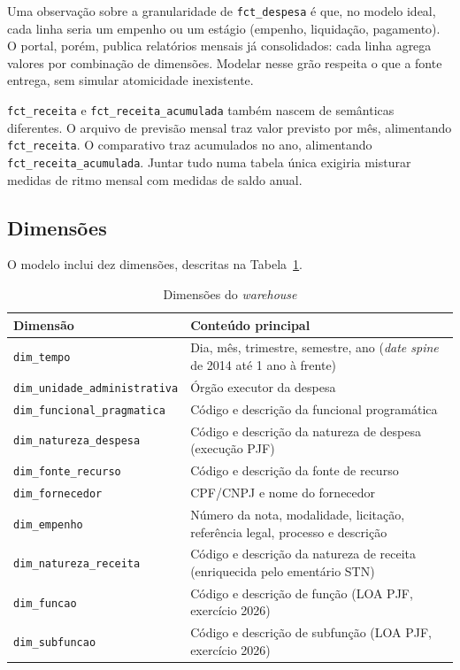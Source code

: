 Uma observação sobre a granularidade de \texttt{fct\_despesa} é que, no modelo ideal, cada linha seria um empenho ou um estágio (empenho, liquidação, pagamento). O portal, porém, publica relatórios mensais já consolidados: cada linha agrega valores por combinação de dimensões. Modelar nesse grão respeita o que a fonte entrega, sem simular atomicidade inexistente.

\texttt{fct\_receita} e \texttt{fct\_receita\_acumulada} também nascem de semânticas diferentes. O arquivo de previsão mensal traz valor previsto por mês, alimentando \texttt{fct\_receita}. O comparativo traz acumulados no ano, alimentando \texttt{fct\_receita\_acumulada}. Juntar tudo numa tabela única exigiria misturar medidas de ritmo mensal com medidas de saldo anual.

\subsection{Dimensões}

O modelo inclui dez dimensões, descritas na Tabela~\ref{tab:dimensoes}.

\begin{table}[htb]
\caption{Dimensões do \textit{warehouse}}
\label{tab:dimensoes}
\centering
\small
\begin{tabular}{p{5.5cm} p{8.5cm}}
\hline
\textbf{Dimensão} & \textbf{Conteúdo principal} \\
\hline
\texttt{dim\_tempo} & Dia, mês, trimestre, semestre, ano (\textit{date spine} de 2014 até 1 ano à frente) \\
\texttt{dim\_unidade\_administrativa} & Órgão executor da despesa \\
\texttt{dim\_funcional\_pragmatica} & Código e descrição da funcional programática \\
\texttt{dim\_natureza\_despesa} & Código e descrição da natureza de despesa (execução PJF) \\
\texttt{dim\_fonte\_recurso} & Código e descrição da fonte de recurso \\
\texttt{dim\_fornecedor} & CPF/CNPJ e nome do fornecedor \\
\texttt{dim\_empenho} & Número da nota, modalidade, licitação, referência legal, processo e descrição \\
\texttt{dim\_natureza\_receita} & Código e descrição da natureza de receita (enriquecida pelo ementário STN) \\
\texttt{dim\_funcao} & Código e descrição de função (LOA PJF, exercício 2026) \\
\texttt{dim\_subfuncao} & Código e descrição de subfunção (LOA PJF, exercício 2026) \\
\hline
\end{tabular}
\end{table}

